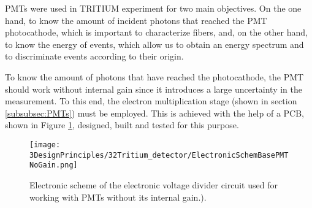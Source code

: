 PMTs were used in TRITIUM experiment for two main objectives. On the one hand, to know the amount of incident photons that reached the PMT photocathode, which is important to characterize fibers, and, on the other hand, to know the energy of events, which allow us to obtain an energy spectrum and to discriminate events according to their origin. %

To know the amount of photons that have reached the photocathode, the PMT should work without internal gain since it introduces a large uncertainty in the measurement. To this end, the electron multiplication stage (shown in section \ref{subsubsec:PMTs}) must be employed. This is achieved with the help of a PCB, shown in Figure \ref{fig:ElectronicSchemeBasePMTNoGain}, designed, built and tested for this purpose.  


\begin{figure}[htbp]
\centering
\texttt{[image: 3DesignPrinciples/32Tritium\_detector/ElectronicSchemBasePMTNoGain.png]}
\caption{Electronic scheme of the electronic voltage divider circuit used for working with PMTs without its internal gain.).\label{fig:ElectronicSchemeBasePMTNoGain}}
\end{figure}

